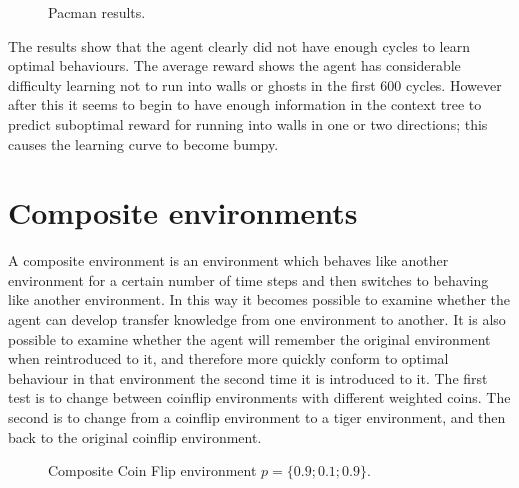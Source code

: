 \documentclass[pdftex,twoside,a4paper]{report}
\begin{document}
\begin{figure}
  \begin{center}
  \end{center}
  \caption{Pacman results.}
  \label{fig:pacman_results}
\end{figure}

The results show that the agent clearly did not have enough cycles to learn optimal behaviours. The average reward shows the agent has considerable difficulty learning not to run into walls or ghosts in the first 600 cycles. However after this it seems to begin to have enough information in the context tree to predict suboptimal reward for running into walls in one or two directions; this causes the learning curve to become bumpy.

\section{Composite environments}

A composite environment is an environment which behaves like another environment for a certain number of time steps and then switches to behaving like another environment. In this way it becomes possible to examine whether the agent can develop transfer knowledge from one environment to another. It is also possible to examine whether the agent will remember the original environment when reintroduced to it, and therefore more quickly conform to optimal behaviour in that environment the second time it is introduced to it. The first test is to change between coinflip environments with different weighted coins. The second is to change from a coinflip environment to a tiger environment, and then back to the original coinflip environment.  

\begin{figure}[!h]
  \begin{center}
  \end{center}
  \caption{Composite Coin Flip environment $p=\{0.9;0.1;0.9\}$.}
  \label{fig:coin_comp101}
\end{figure}
\end{document}
